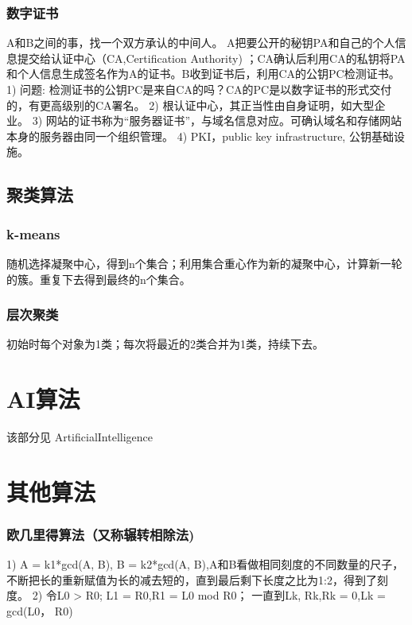 \documentclass[UTF8]{../computerUniverse}
\begin{document}
\subsection{数字证书}
A和B之间的事，找一个双方承认的中间人。
A把要公开的秘钥PA和自己的个人信息提交给认证中心（CA,Certification Authority) ；CA确认后利用CA的私钥将PA和个人信息生成签名作为A的证书。B收到证书后，利用CA的公钥PC检测证书。
1) 问题: 检测证书的公钥PC是来自CA的吗？CA的PC是以数字证书的形式交付的，有更高级别的CA署名。
2) 根认证中心，其正当性由自身证明，如大型企业。
3) 网站的证书称为“服务器证书”，与域名信息对应。可确认域名和存储网站本身的服务器由同一个组织管理。
4) PKI，public key infrastructure, 公钥基础设施。



\section{聚类算法}

\subsection{k-means}
随机选择凝聚中心，得到n个集合；利用集合重心作为新的凝聚中心，计算新一轮的簇。重复下去得到最终的n个集合。

\subsection{层次聚类}
初始时每个对象为1类；每次将最近的2类合并为1类，持续下去。



\chapter{AI算法}%
该部分见 ArtificialIntelligence




\chapter{其他算法}

\subsection{欧几里得算法（又称辗转相除法) }
1) A = k1*gcd(A, B), B = k2*gcd(A, B),A和B看做相同刻度的不同数量的尺子，不断把长的重新赋值为长的减去短的，直到最后剩下长度之比为1:2，得到了刻度。
2) 令L0 > R0;
L1 = R0,R1 = L0 mod R0；
一直到Lk, Rk,Rk = 0,Lk = gcd(L0， R0)
\end{document}

